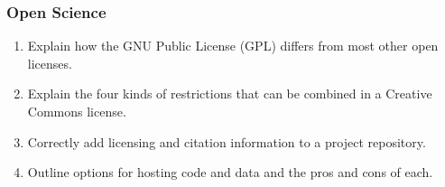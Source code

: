 \documentclass[xcolor=dvipsnames]{beamer}
\begin{document}
\begin{frame}
\frametitle{Open Science}
\begin{enumerate}
  \item Explain how the GNU Public License (GPL) differs from most other open licenses.
  \item Explain the four kinds of restrictions that can be combined in a Creative Commons license.
  \item Correctly add licensing and citation information to a project repository.
  \item Outline options for hosting code and data and the pros and cons of each.
\end{enumerate}
\end{frame}
\end{document}
